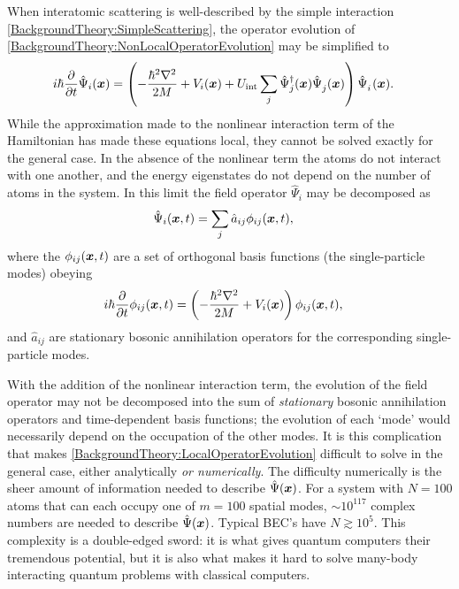 When interatomic scattering is well-described by the simple interaction \eqref{BackgroundTheory:SimpleScattering}, the operator evolution of \eqref{BackgroundTheory:NonLocalOperatorEvolution} may be simplified to
\begin{align}
    i \hbar \frac{\partial}{\partial t} \hat{\Psi}_i(\vect{x}) &= \left( -\frac{\hbar^2 \nabla^2}{2 M} + V_{i}(\vect{x}) + U_\text{int} \sum_{j} \hat{\Psi}_j^\dagger(\vect{x}) \hat{\Psi}_j^{\phantom{\dagger}}(\vect{x}) \right) \hat{\Psi}_i^{\phantom{\dagger}}(\vect{x}). \label{BackgroundTheory:LocalOperatorEvolution}
\end{align}
While the approximation made to the nonlinear interaction term of the Hamiltonian has made these equations local, they cannot be solved exactly for the general case.  In the absence of the nonlinear term the atoms do not interact with one another, and the energy eigenstates do not depend on the number of atoms in the system.  In this limit the field operator $\hat{\Psi}_i$ may be decomposed as
\begin{align}
    \hat{\Psi}_i(\bm{x}, t) &= \sum_j \hat{a}_{ij} \phi_{ij}(\bm{x}, t),
\end{align}
where the $\phi_{ij}(\bm{x}, t)$ are a set of orthogonal basis functions (the single-particle modes) obeying
\begin{align}
    i \hbar \frac{\partial }{\partial t} \phi_{ij}(\bm{x}, t) &= \left( - \frac{\hbar^2 \nabla^2}{2M} + V_i(\bm{x}) \right) \phi_{ij}(\bm{x}, t),
\end{align}
and $\hat{a}_{ij}$ are stationary bosonic annihilation operators for the corresponding single-particle modes.  

With the addition of the nonlinear interaction term, the evolution of the field operator may not be decomposed into the sum of \emph{stationary} bosonic annihilation operators and time-dependent basis functions; the evolution of each `mode' would necessarily depend on the occupation of the other modes.  It is this complication that makes \eqref{BackgroundTheory:LocalOperatorEvolution} difficult to solve in the general case, either analytically \emph{or numerically}.  The difficulty numerically is the sheer amount of information needed to describe $\hat{\Psi}(\bm{x})$.  For a system with $N=100$ atoms that can each occupy one of $m = 100$ spatial modes, $\sim 10^{117}$ complex numbers are needed to describe $\hat{\Psi}(\bm{x})$.  Typical BEC's have $N \gtrsim 10^5$.  This complexity is a double-edged sword: it is what gives quantum computers their tremendous potential, but it is also what makes it hard to solve many-body interacting quantum problems with classical computers.

